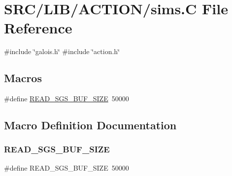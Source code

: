\hypertarget{sims_8_c}{}\section{S\+R\+C/\+L\+I\+B/\+A\+C\+T\+I\+O\+N/sims.C File Reference}
\label{sims_8_c}
{\ttfamily \#include \char`\"{}galois.\+h\char`\"{}}\newline
{\ttfamily \#include \char`\"{}action.\+h\char`\"{}}\newline
\subsection*{Macros}
\begin{DoxyCompactItemize}
\item 
\#define \mbox{\hyperlink{sims_8_c_a2c6e5448fa4647b2a377572139b4bc89}{R\+E\+A\+D\+\_\+\+S\+G\+S\+\_\+\+B\+U\+F\+\_\+\+S\+I\+ZE}}~50000
\end{DoxyCompactItemize}


\subsection{Macro Definition Documentation}
\mbox{\label{sims_8_c_a2c6e5448fa4647b2a377572139b4bc89}} 
\subsubsection{\texorpdfstring{R\+E\+A\+D\+\_\+\+S\+G\+S\+\_\+\+B\+U\+F\+\_\+\+S\+I\+ZE}{READ\_SGS\_BUF\_SIZE}}
{\footnotesize\ttfamily \#define R\+E\+A\+D\+\_\+\+S\+G\+S\+\_\+\+B\+U\+F\+\_\+\+S\+I\+ZE~50000}

